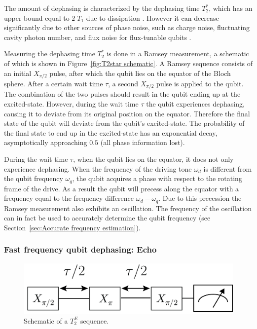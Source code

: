           The amount of dephasing is characterized by the dephasing time $T_2^*$, which has an upper bound equal to $2\;T_1$ due to dissipation \cite[pp56-58]{Bishop}. However it can decrease significantly due to other sources of phase noise, such as charge noise, fluctuating cavity photon number, and flux noise for flux-tunable qubits \cite[p126]{Sears}.

          Measuring the dephasing time $T_2^*$ is done in a Ramsey measurement, a schematic of which is shown in Figure~\ref{fig:T2star schematic}. A Ramsey sequence consists of an initial $X_{\pi/2}$ pulse, after which the qubit lies on the equator of the Bloch sphere. After a certain wait time $\tau$, a second $X_{\pi/2}$ pulse is applied to the qubit. The combination of the two pulses should result in the qubit ending up at the excited-state. However, during the wait time $\tau$ the qubit experiences dephasing, causing it to deviate from its original position on the equator. Therefore the final state of the qubit will deviate from the qubit's excited-state. The probability of the final state to end up in the excited-state has an exponential decay, asymptotically approaching $0.5$ (all phase information lost).

          During the wait time $\tau$, when the qubit lies on the equator, it does not only experience dephasing. When the frequency of the driving tone $\omega_d$ is different from the qubit frequency $\omega_q$, the qubit acquires a phase with respect to the rotating frame of the drive. As a result the qubit will precess along the equator with a frequency equal to the frequency difference $\omega_d - \omega_q$. Due to this precession the Ramsey measurement also exhibits an oscillation. The frequency of the oscillation can in fact be used to accurately determine the qubit frequency (see Section~\ref{sec:Accurate frequency estimation}).

        \subsubsection{Fast frequency qubit dephasing: Echo}

          \begin{figure}
            \begin{center}
            \vspace{-30pt}
              \includegraphics[width=\textwidth]{../Figures/Qubit characterization/T2echo decoherence.png}
            \end{center}
            \vspace{-20 pt}
            \caption{Schematic of a $T_2^E$ sequence.}
            \label{fig:T2echo schematic}
          \end{figure}

